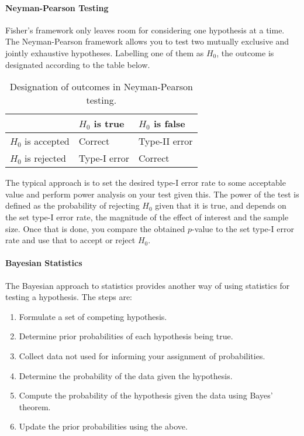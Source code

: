 \paragraph{Neyman-Pearson Testing}
Fisher's framework only leaves room for considering one hypothesis at a time. The Neyman-Pearson framework allows you to test two mutually exclusive and jointly exhaustive hypotheses. Labelling one of them as $H_{0}$, the outcome is designated according to the table below.

\begin{table}[!ht]
	\centering
	\begin{tabular}{| l | l | l |}
		\hline
		                    & $H_{0}$ is true & $H_{0}$ is false \\
		\hline
		$H_{0}$ is accepted & Correct         & Type-II error \\
		\hline
		$H_{0}$ is rejected & Type-I error    & Correct \\
		\hline
	\end{tabular}
	\caption{Designation of outcomes in Neyman-Pearson testing.}
\end{table}

The typical approach is to set the desired type-I error rate to some acceptable value and perform power analysis on your test given this. The power of the test is defined as the probability of rejecting $H_{0}$ given that it is true, and depends on the set type-I error rate, the magnitude of the effect of interest and the sample size. Once that is done, you compare the obtained $p$-value to the set type-I error rate and use that to accept or reject $H_{0}$.

\paragraph{Bayesian Statistics}
The Bayesian approach to statistics provides another way of using statistics for testing a hypothesis. The steps are:
\begin{enumerate}
	\item Formulate a set of competing hypothesis.
	\item Determine prior probabilities of each hypothesis being true.
	\item Collect data not used for informing your assignment of probabilities.
	\item Determine the probability of the data given the hypothesis.
	\item Compute the probability of the hypothesis given the data using Bayes' theorem.
	\item Update the prior probabilities using the above.
\end{enumerate}

